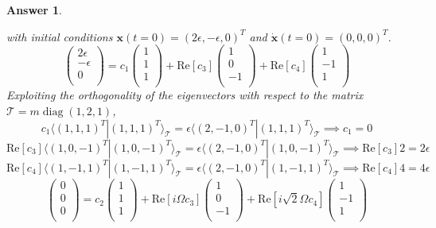 \documentclass[a4paper]{article}
\DeclareMathOperator{\diag}{diag}
\newtheorem{ans}{Answer}[section]
\theoremstyle{new}
\begin{document}
\begin{ans}
\begin{enumerate}[label=(\alph*)]
with initial conditions $\mathbf{x}(t=0)=(2\epsilon,-\epsilon,0)^T$ and $\mathbf{\dot{x}}(t=0)=(0,0,0)^T$.
$$\begin{pmatrix}2\epsilon\\-\epsilon\\0\\\end{pmatrix}=c_1\begin{pmatrix}1\\1\\1\\\end{pmatrix}+\text{Re}[c_3]\begin{pmatrix}1\\0\\-1\\\end{pmatrix}+\text{Re}[c_4]\begin{pmatrix}1\\-1\\1\\\end{pmatrix}$$
Exploiting the orthogonality of the eigenvectors with respect to the matrix $\mathcal{T}=m\diag(1,2,1)$,
$$c_1\langle(1,1,1)^T|(1,1,1)^T\rangle_{\mathcal{T}}=\epsilon\langle (2,-1,0)^T|(1,1,1)^T\rangle_{\mathcal{T}}\implies c_1=0$$
$$\text{Re}[c_3]\langle(1,0,-1)^T|(1,0,-1)^T\rangle_{\mathcal{T}}=\epsilon\langle (2,-1,0)^T|(1,0,-1)^T\rangle_{\mathcal{T}}\implies \text{Re}[c_3]2=2\epsilon$$
$$\text{Re}[c_4]\langle(1,-1,1)^T|(1,-1,1)^T\rangle_{\mathcal{T}}=\epsilon\langle (2,-1,0)^T|(1,-1,1)^T\rangle_{\mathcal{T}}\implies \text{Re}[c_4]4=4\epsilon$$
$$\begin{pmatrix}0\\0\\0\\\end{pmatrix}=c_2\begin{pmatrix}1\\1\\1\\\end{pmatrix}+\text{Re}[i\Omega c_3]\begin{pmatrix}1\\0\\-1\\\end{pmatrix}+\text{Re}[i\sqrt{2}\Omega c_4]\begin{pmatrix}1\\-1\\1\\\end{pmatrix}$$

\end{enumerate}
\end{ans}
\end{document}
